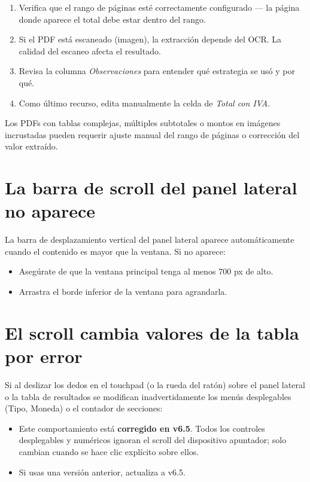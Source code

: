 \documentclass[12pt, a4paper, oneside]{report}
\newcommand{\campo}[1]{\textit{#1}}
\begin{document}
\begin{enumerate}
  \item Verifica que el rango de páginas esté correctamente configurado —
        la página donde aparece el total debe estar dentro del rango.
  \item Si el PDF está escaneado (imagen), la extracción depende del OCR.
        La calidad del escaneo afecta el resultado.
  \item Revisa la columna \campo{Observaciones} para entender qué estrategia
        se usó y por qué.
  \item Como último recurso, edita manualmente la celda de \campo{Total con IVA}.
\end{enumerate}

\begin{warningbox}
Los PDFs con tablas complejas, múltiples subtotales o montos en imágenes
incrustadas pueden requerir ajuste manual del rango de páginas o corrección
del valor extraído.
\end{warningbox}

\section{La barra de scroll del panel lateral no aparece}

La barra de desplazamiento vertical del panel lateral aparece automáticamente
cuando el contenido es mayor que la ventana. Si no aparece:

\begin{itemize}
  \item Asegúrate de que la ventana principal tenga al menos 700 px de alto.
  \item Arrastra el borde inferior de la ventana para agrandarla.
\end{itemize}

\section{El scroll cambia valores de la tabla por error}

Si al deslizar los dedos en el touchpad (o la rueda del ratón) sobre el
panel lateral o la tabla de resultados se modifican inadvertidamente los
menús desplegables (Tipo, Moneda) o el contador de secciones:

\begin{itemize}
  \item Este comportamiento está \textbf{corregido en v6.5}. Todos los
        controles desplegables y numéricos ignoran el scroll del dispositivo
        apuntador; solo cambian cuando se hace clic explícito sobre ellos.
  \item Si usas una versión anterior, actualiza a v6.5.
\end{itemize}
\end{document}
